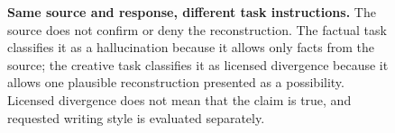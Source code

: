 \begin{figure}[!t]
{%
}
\endgroup
\caption{\textbf{Same source and response, different task instructions.}
The source does not confirm or deny the reconstruction. The factual task
classifies it as a hallucination because it allows only facts from the source;
the creative task classifies it as licensed divergence because it allows one
plausible reconstruction presented as a possibility. Licensed divergence does
not mean that the claim is true, and requested writing style is evaluated
separately.}
\label{fig:prompt-to-claim}
\end{figure}
